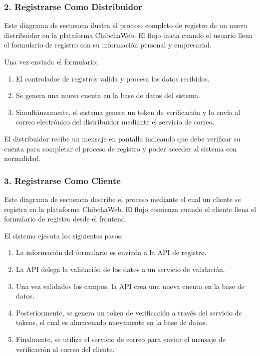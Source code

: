 \subsubsection*{2.  Registrarse Como Distribuidor}

Este diagrama de secuencia ilustra el proceso completo de registro de un nuevo distribuidor en la plataforma ChibchaWeb. El flujo inicia cuando el usuario llena el formulario de registro con su información personal y empresarial.

Una vez enviado el formulario:

\begin{enumerate}
\item El controlador de registros valida y procesa los datos recibidos.

\item Se genera una nueva cuenta en la base de datos del sistema.

\item Simultáneamente, el sistema genera un token de verificación y lo envía al correo electrónico del distribuidor mediante el servicio de correo.
\end{enumerate}

El distribuidor recibe un mensaje en pantalla indicando que debe verificar su cuenta para completar el proceso de registro y poder acceder al sistema con normalidad.

\subsubsection*{3. Registrarse Como Cliente}

Este diagrama de secuencia describe el proceso mediante el cual un cliente se registra en la plataforma ChibchaWeb. El flujo comienza cuando el cliente llena el formulario de registro desde el frontend.

El sistema ejecuta los siguientes pasos:

\begin{enumerate}
    \item La información del formulario es enviada a la API de registro.
    \item La API delega la validación de los datos a un servicio de validación.
    \item Una vez validados los campos, la API crea una nueva cuenta en la base de datos.
    \item Posteriormente, se genera un token de verificación a través del servicio de tokens, el cual es almacenado nuevamente en la base de datos.
    \item Finalmente, se utiliza el servicio de correo para enviar el mensaje de verificación al correo del cliente.
\end{enumerate}

